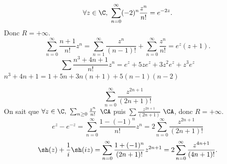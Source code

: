 \documentclass[11pt]{article}
\begin{document}
\vspace*{-0.8cm}

\begin{ex}{}{}
    \begin{equation*}
        \forall z \in \C, ~ \sum_{n=0}^{\infty}(-2)^n\frac{z^n}{n!}=e^{-2z}.
    \end{equation*}
    Donc $R=+\infty$.
    \begin{equation*}
        \sum_{n=0}^\infty\frac{n+1}{n!}z^n=\sum_{n=1}^\infty\frac{z^n}{(n-1)!}+\sum_{n=0}^\infty\frac{z^n}{n!}=e^z(z+1).
    \end{equation*}
    \begin{equation*}
        \sum\frac{n^3+4n+1}{n!}z^n = e^z + 5ze^z + 3z^2e^z + z^3e^z
    \end{equation*}
    $n^3+4n+1=1+5n+3n(n+1)+5(n-1)(n-2)$ 
\end{ex}

\vspace*{-0.8cm}

\begin{ex}{}{}
    \begin{equation*}
        \sum_{n=0}^{\infty}\frac{z^{2n+1}}{(2n+1)!}
    \end{equation*}
    On sait que $\forall z \in \C, ~ \sum_{n\geq0} \frac{z^n}{n!}$ $\CA$ puis $\sum\frac{z^{2n+1}}{(2n+1)}$ $\CA$, donc $R=+\infty$.
    \begin{equation*}
        e^z - e^{-z} = \sum_{n=0}^\infty\frac{1-(-1)^n}{n!}z^n = 2\sum_{n=0}^\infty\frac{z^{2n+1}}{(2n+1)!}
    \end{equation*}
    \begin{equation*}
        \sh(z) + \frac{1}{i}\sh(iz) = \sum_{n=0}^\infty \frac{1 + (-1)^n}{(2n+1)!}z^{2n+1} = 2\sum_{n=0}^\infty\frac{z^{4n+1}}{(4n+1)!}.
    \end{equation*}
\end{ex}
\end{document}
